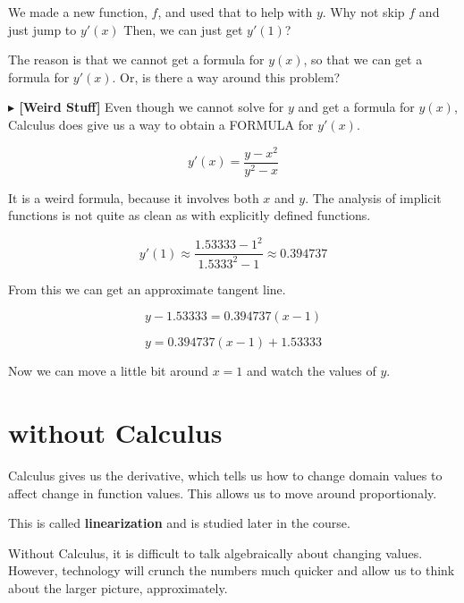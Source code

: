 \documentclass{ximera}
\begin{document}
We made a new function, $f$, and used that to help with $y$.  Why not skip $f$ and just jump to $y'(x)$  Then, we can just get $y'(1)$?

The reason is that we cannot get a formula for $y(x)$, so that we can get a formula for $y'(x)$. Or, is there a way around this problem?



\textbf{\textcolor{red!80!black}{$\blacktriangleright$  [Weird Stuff]}}  Even though we cannot solve for $y$ and get a formula for $y(x)$, Calculus does give us a way to obtain a FORMULA for $y'(x)$.



\[
y'(x) = \frac{y - x^2}{y^2 - x}
\]


It is a weird formula, because it involves both $x$ and $y$.  The analysis of implicit functions is not quite as clean as with explicitly defined functions.


\[
y'(1) \approx \frac{1.53333 - 1^2}{1.5333^2 - 1} \approx 0.394737
\]



From this we can get an approximate tangent line.

\[
y - 1.53333 = 0.394737(x-1)
\]


\[
y = 0.394737(x-1) + 1.53333
\]


Now we can move a little bit around $x=1$ and watch the values of $y$.



\begin{center}
\end{center}






\section{without Calculus}



Calculus gives us the derivative, which tells us how to change domain values to affect change in function values.  This allows us to move around proportionaly.  

This is called \textbf{linearization} and is studied later in the course.

Without Calculus, it is difficult to talk algebraically about changing values.  However, technology will crunch the numbers much quicker and allow us to think about the larger picture, approximately.
\end{document}
